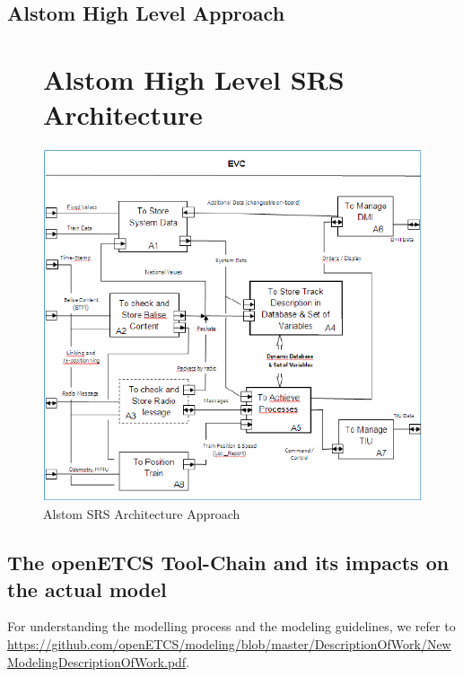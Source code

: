 \documentclass{template/openetcs_article}
\begin{document}
\newpage

\subsection{Alstom High Level Approach}
 \begin{figure}[hbtp]
\section{Alstom High Level SRS Architecture}
\centering
\includegraphics [scale=0.8] {images/Alstom_High_Level_Approach}
\caption{Alstom SRS Architecture Approach}
\end{figure}

\newpage
\subsection{The openETCS Tool-Chain and its impacts on the actual model}

For understanding the modelling process and the modeling guidelines, we refer to \url{https://github.com/openETCS/modeling/blob/master/DescriptionOfWork/NewModelingDescriptionOfWork.pdf}.
\end{document}
